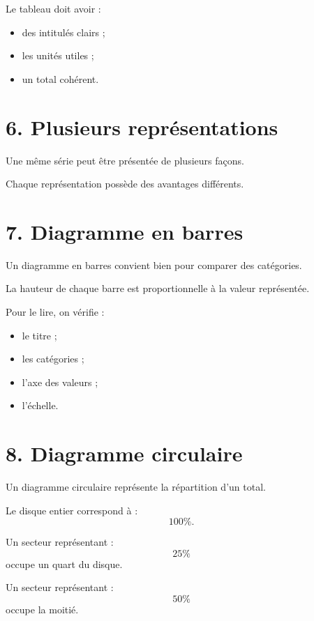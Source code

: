 Le tableau doit avoir :
\begin{itemize}
\item des intitulés clairs ;
\item les unités utiles ;
\item un total cohérent.
\end{itemize}

\section{6. Plusieurs représentations}

Une même série peut être présentée de plusieurs façons.


Chaque représentation possède des avantages différents.

\section{7. Diagramme en barres}

Un diagramme en barres convient bien pour comparer des catégories.

La hauteur de chaque barre est proportionnelle à la valeur représentée.

Pour le lire, on vérifie :
\begin{itemize}
\item le titre ;
\item les catégories ;
\item l'axe des valeurs ;
\item l'échelle.
\end{itemize}

\section{8. Diagramme circulaire}

Un diagramme circulaire représente la répartition d'un total.

Le disque entier correspond à :
\[
100\%.
\]

Un secteur représentant :
\[
25\%
\]
occupe un quart du disque.

Un secteur représentant :
\[
50\%
\]
occupe la moitié.

